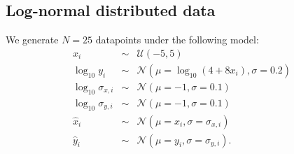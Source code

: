 \documentclass[fleqn,usenatbib]{rasti}
\begin{document}
\subsection{Log-normal distributed data}
\label{sec:data-models.lognormal}

We generate $N = 25$ datapoints under the following model:
\begin{eqnarray}
    x_i &\sim& \mathcal U (-5, 5) \\
    \log_{10} y_i &\sim& \mathcal N (\mu = \log_{10} (4 + 8 x_i), \sigma = 0.2) \\
    \log_{10} \sigma_{x, i} &\sim& \mathcal N (\mu = -1, \sigma = 0.1) \\
    \log_{10} \sigma_{y, i} &\sim& \mathcal N (\mu = -1, \sigma = 0.1) \\
    \hat{x}_i &\sim& \mathcal N (\mu = x_i, \sigma = \sigma_{x, i}) \\
    \hat{y}_i &\sim& \mathcal N (\mu = y_i, \sigma = \sigma_{y, i}).
\end{eqnarray}




\bsp	%
\label{lastpage}
\end{document}
